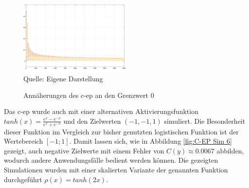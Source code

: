 \begin{figure}[h]
  \caption{Annäherungen des \ac{c-ep} an den Grenzwert \(0\)}
  \centering
  \includegraphics[width=0.5\textwidth]{abbildungen/c_ep_sim_5_ausgabe.png}
  \\
  Quelle: Eigene Darstellung
  \label{fig:C-EP Sim 5}
\end{figure}

Das \ac{c-ep} wurde auch mit einer alternativen Aktivierungsfunktion \(tanh(x)=\frac{e^x-e^{-x}}{e^x+e^{-x}}\) und den Zielwerten \((-1,-1,1)\) simuliert. Die Besonderheit dieser Funktion im Vergleich zur bisher genutzten logistischen Funktion ist der Wertebereich \([-1;1]\). Damit lassen sich, wie in Abbildung \ref{fig:C-EP Sim 6} gezeigt, auch negative Zielwerte mit einem Fehler von \(C(y)\approx0.0067\) abbilden, wodurch andere Anwendungsfälle bedient werden können. Die gezeigten Simulationen wurden mit einer skalierten Variante der genannten Funktion durchgeführt \(\rho(x)=tanh(2x)\).

